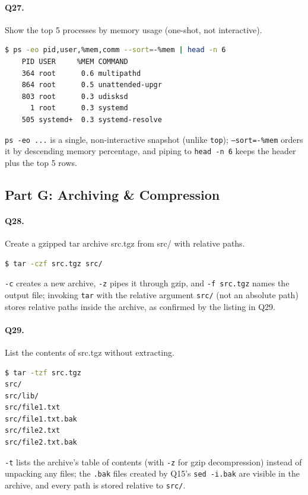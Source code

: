 \paragraph{Q27.} Show the top 5 processes by memory usage (one-shot, not interactive).
\begin{lstlisting}[language=bash,caption={Q27 evidence: \texttt{ps -eo pid,user,\%mem,comm --sort=-\%mem | head -n 6}},label={Listing:Q27}]
$ ps -eo pid,user,%mem,comm --sort=-%mem | head -n 6
    PID USER     %MEM COMMAND
    364 root      0.6 multipathd
    864 root      0.5 unattended-upgr
    803 root      0.3 udisksd
      1 root      0.3 systemd
    505 systemd+  0.3 systemd-resolve
\end{lstlisting}
\texttt{ps -eo ...} is a single, non-interactive snapshot (unlike \texttt{top}); \texttt{--sort=-\%mem} orders it by descending memory percentage, and piping to \texttt{head -n 6} keeps the header plus the top 5 rows.

\subsection{Part G: Archiving \& Compression}
\paragraph{Q28.} Create a gzipped tar archive src.tgz from src/ with relative paths.
\begin{lstlisting}[language=bash,caption={Q28 evidence: \texttt{tar -czf src.tgz src/}},label={Listing:Q28}]
$ tar -czf src.tgz src/
\end{lstlisting}
\texttt{-c} creates a new archive, \texttt{-z} pipes it through gzip, and \texttt{-f src.tgz} names the output file; invoking \texttt{tar} with the relative argument \texttt{src/} (not an absolute path) stores relative paths inside the archive, as confirmed by the listing in Q29.

\paragraph{Q29.} List the contents of src.tgz without extracting.
\begin{lstlisting}[language=bash,caption={Q29 evidence: \texttt{tar -tzf src.tgz}},label={Listing:Q29}]
$ tar -tzf src.tgz
src/
src/lib/
src/file1.txt
src/file1.txt.bak
src/file2.txt
src/file2.txt.bak
\end{lstlisting}
\texttt{-t} lists the archive's table of contents (with \texttt{-z} for gzip decompression) instead of unpacking any files; the \texttt{.bak} files created by Q15's \texttt{sed -i.bak} are visible in the archive, and every path is stored relative to \texttt{src/}.

